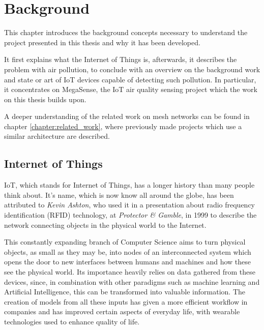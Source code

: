 

\chapter{Background}\label{chap:background}

	This chapter introduces the background concepts necessary to understand the project presented in this thesis and why it has been developed.
	
	It first explains what the Internet of Things is, afterwards, it describes the problem with air pollution, to conclude with an overview on the background work and state or art of IoT devices capable of detecting such pollution.
	In particular, it concentrates on MegaSense, the IoT air quality sensing project which the work on this thesis builds upon.

	A deeper understanding of the related work on mesh networks can be found in chapter \ref{chapter:related_work}, where previously made projects which use a similar architecture are described.

\section{Internet of Things}

	IoT, which stands for Internet of Things, has a longer history than many people think about.
	It's name, which is now know all around the globe, has been attributed to \textit{Kevin Ashton}, who used it in a presentation about radio frequency identification (RFID) technology, at \textit{Protector \& Gamble}, in 1999 \cite{iot_definition} to describe the network connecting objects in the physical world to the Internet.
	
	This constantly expanding branch of Computer Science aims to turn physical objects, as small as they may be, into nodes of an interconnected system which opens the door to new interfaces between humans and machines and how these see the physical world.
	Its importance heavily relies on data gathered from these devices, since, in combination with other paradigms such as machine learning and Artificial Intelligence, this can be transformed into valuable information.
	The creation of models from all these inputs has given a more efficient workflow in companies and has improved certain aspects of everyday life, with wearable technologies used to enhance quality of life.
	
